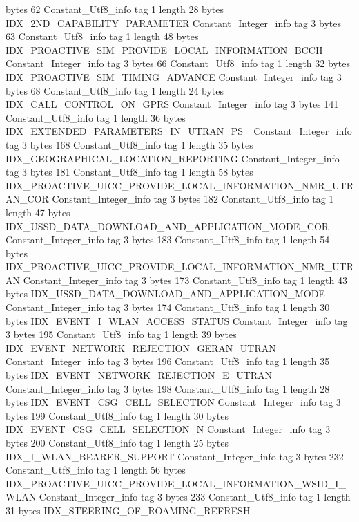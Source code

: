 {{{			bytes	62
		}
		Constant_Utf8_info {
			tag	1
			length	28
			bytes	IDX_2ND_CAPABILITY_PARAMETER
		}
		Constant_Integer_info {
			tag	3
			bytes	63
		}
		Constant_Utf8_info {
			tag	1
			length	48
			bytes	IDX_PROACTIVE_SIM_PROVIDE_LOCAL_INFORMATION_BCCH
		}
		Constant_Integer_info {
			tag	3
			bytes	66
		}
		Constant_Utf8_info {
			tag	1
			length	32
			bytes	IDX_PROACTIVE_SIM_TIMING_ADVANCE
		}
		Constant_Integer_info {
			tag	3
			bytes	68
		}
		Constant_Utf8_info {
			tag	1
			length	24
			bytes	IDX_CALL_CONTROL_ON_GPRS
		}
		Constant_Integer_info {
			tag	3
			bytes	141
		}
		Constant_Utf8_info {
			tag	1
			length	36
			bytes	IDX_EXTENDED_PARAMETERS_IN_UTRAN_PS_
		}
		Constant_Integer_info {
			tag	3
			bytes	168
		}
		Constant_Utf8_info {
			tag	1
			length	35
			bytes	IDX_GEOGRAPHICAL_LOCATION_REPORTING
		}
		Constant_Integer_info {
			tag	3
			bytes	181
		}
		Constant_Utf8_info {
			tag	1
			length	58
			bytes	IDX_PROACTIVE_UICC_PROVIDE_LOCAL_INFORMATION_NMR_UTRAN_COR
		}
		Constant_Integer_info {
			tag	3
			bytes	182
		}
		Constant_Utf8_info {
			tag	1
			length	47
			bytes	IDX_USSD_DATA_DOWNLOAD_AND_APPLICATION_MODE_COR
		}
		Constant_Integer_info {
			tag	3
			bytes	183
		}
		Constant_Utf8_info {
			tag	1
			length	54
			bytes	IDX_PROACTIVE_UICC_PROVIDE_LOCAL_INFORMATION_NMR_UTRAN
		}
		Constant_Integer_info {
			tag	3
			bytes	173
		}
		Constant_Utf8_info {
			tag	1
			length	43
			bytes	IDX_USSD_DATA_DOWNLOAD_AND_APPLICATION_MODE
		}
		Constant_Integer_info {
			tag	3
			bytes	174
		}
		Constant_Utf8_info {
			tag	1
			length	30
			bytes	IDX_EVENT_I_WLAN_ACCESS_STATUS
		}
		Constant_Integer_info {
			tag	3
			bytes	195
		}
		Constant_Utf8_info {
			tag	1
			length	39
			bytes	IDX_EVENT_NETWORK_REJECTION_GERAN_UTRAN
		}
		Constant_Integer_info {
			tag	3
			bytes	196
		}
		Constant_Utf8_info {
			tag	1
			length	35
			bytes	IDX_EVENT_NETWORK_REJECTION_E_UTRAN
		}
		Constant_Integer_info {
			tag	3
			bytes	198
		}
		Constant_Utf8_info {
			tag	1
			length	28
			bytes	IDX_EVENT_CSG_CELL_SELECTION
		}
		Constant_Integer_info {
			tag	3
			bytes	199
		}
		Constant_Utf8_info {
			tag	1
			length	30
			bytes	IDX_EVENT_CSG_CELL_SELECTION_N
		}
		Constant_Integer_info {
			tag	3
			bytes	200
		}
		Constant_Utf8_info {
			tag	1
			length	25
			bytes	IDX_I_WLAN_BEARER_SUPPORT
		}
		Constant_Integer_info {
			tag	3
			bytes	232
		}
		Constant_Utf8_info {
			tag	1
			length	56
			bytes	IDX_PROACTIVE_UICC_PROVIDE_LOCAL_INFORMATION_WSID_I_WLAN
		}
		Constant_Integer_info {
			tag	3
			bytes	233
		}
		Constant_Utf8_info {
			tag	1
			length	31
			bytes	IDX_STEERING_OF_ROAMING_REFRESH
}}}
